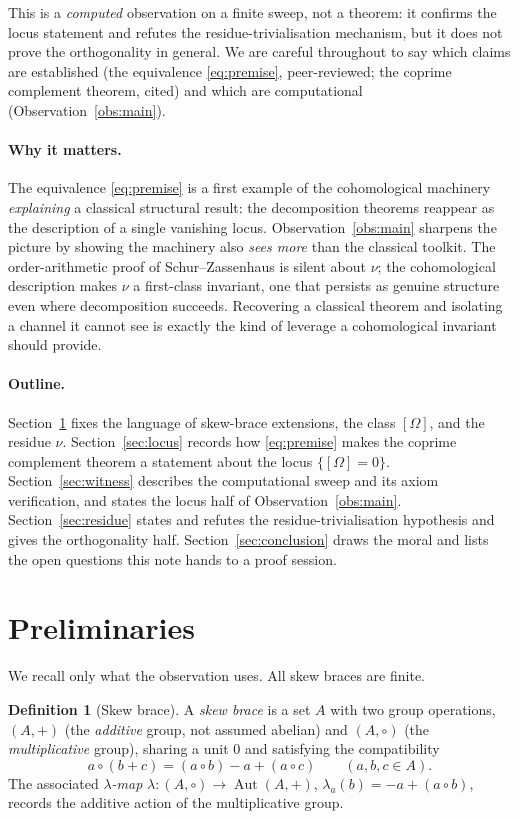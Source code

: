 \documentclass[11pt]{article}
\theoremstyle{definition}
\newtheorem{definition}[theorem]{Definition}
\newcommand{\Aut}{\operatorname{Aut}}
\begin{document}
This is a \emph{computed} observation on a finite sweep, not a theorem: it confirms the
locus statement and refutes the residue-trivialisation mechanism, but it does not prove the
orthogonality in general. We are careful throughout to say which claims are established
(the equivalence \eqref{eq:premise}, peer-reviewed; the coprime complement theorem, cited)
and which are computational (Observation~\ref{obs:main}).

\paragraph{Why it matters.}
The equivalence \eqref{eq:premise} is a first example of the cohomological machinery
\emph{explaining} a classical structural result: the decomposition theorems reappear as the
description of a single vanishing locus. Observation~\ref{obs:main} sharpens the picture by
showing the machinery also \emph{sees more} than the classical toolkit. The order-arithmetic
proof of Schur--Zassenhaus is silent about $\nu$; the cohomological description makes $\nu$ a
first-class invariant, one that persists as genuine structure even where decomposition
succeeds. Recovering a classical theorem and isolating a channel it cannot see is exactly the
kind of leverage a cohomological invariant should provide.

\paragraph{Outline.}
Section~\ref{sec:prelim} fixes the language of skew-brace extensions, the class $[\Omega]$,
and the residue $\nu$. Section~\ref{sec:locus} records how \eqref{eq:premise} makes the
coprime complement theorem a statement about the locus $\{[\Omega]=0\}$.
Section~\ref{sec:witness} describes the computational sweep and its axiom verification, and
states the locus half of Observation~\ref{obs:main}. Section~\ref{sec:residue} states and
refutes the residue-trivialisation hypothesis and gives the orthogonality half.
Section~\ref{sec:conclusion} draws the moral and lists the open questions this note hands to
a proof session.

\section{Preliminaries}\label{sec:prelim}

We recall only what the observation uses. All skew braces are finite.

\begin{definition}[Skew brace]
A \emph{skew brace} is a set $A$ with two group operations, $(A,+)$ (the \emph{additive}
group, not assumed abelian) and $(A,\circ)$ (the \emph{multiplicative} group), sharing a unit
$0$ and satisfying the compatibility
\[
a\circ(b+c) = (a\circ b) - a + (a\circ c)
\qquad(a,b,c\in A).
\]
The associated \emph{$\lambda$-map} $\lambda\colon (A,\circ)\to\Aut(A,+)$, $\lambda_a(b)=-a+(a\circ b)$,
records the additive action of the multiplicative group.
\end{definition}
\end{document}

